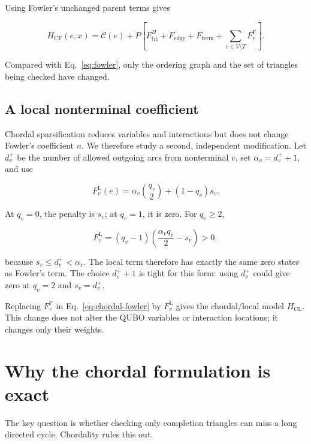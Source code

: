 \documentclass[10pt,a4paper]{article}
\newcommand{\C}{\mathcal C}
\begin{document}
Using Fowler's unchanged parent terms gives

\begin{equation}
H_{\mathrm{CF}}(e,x)=\C(e)+P\left[
F_{\mathrm{tri}}^{H}+F_{\mathrm{edge}}+F_{\mathrm{term}}
+\sum_{v\in V\setminus T}F_v^{\mathrm F}\right].
\label{eq:chordal-fowler}
\end{equation}

Compared with Eq.~\eqref{eq:fowler}, only the ordering graph and the set of
triangles being checked have changed.

\subsection{A local nonterminal coefficient}

Chordal sparsification reduces variables and interactions but does not change
Fowler's coefficient $n$. We therefore study a second, independent
modification. Let $d_v^+$ be the number of allowed outgoing arcs from
nonterminal $v$, set $\alpha_v=d_v^++1$, and use

\begin{equation}
F_v^{\mathrm L}(e)=
\alpha_v\binom{q_v}{2}+(1-q_v)s_v.
\label{eq:local-parent}
\end{equation}

At $q_v=0$, the penalty is $s_v$; at $q_v=1$, it is zero. For $q_v\ge2$,

\begin{equation}
F_v^{\mathrm L}
=(q_v-1)\left(\frac{\alpha_vq_v}{2}-s_v\right)>0,
\label{eq:local-positive}
\end{equation}

because $s_v\le d_v^+<\alpha_v$. The local term therefore has exactly the same
zero states as Fowler's term. The choice $d_v^++1$ is tight for this form:
using $d_v^+$ could give zero at $q_v=2$ and $s_v=d_v^+$.

Replacing $F_v^{\mathrm F}$ in Eq.~\eqref{eq:chordal-fowler} by
$F_v^{\mathrm L}$ gives the chordal/local model $H_{\mathrm{CL}}$. This change
does not alter the QUBO variables or interaction locations; it changes only
their weights.

\section{Why the chordal formulation is exact}

The key question is whether checking only completion triangles can miss a long
directed cycle. Chordality rules this out.
\end{document}
